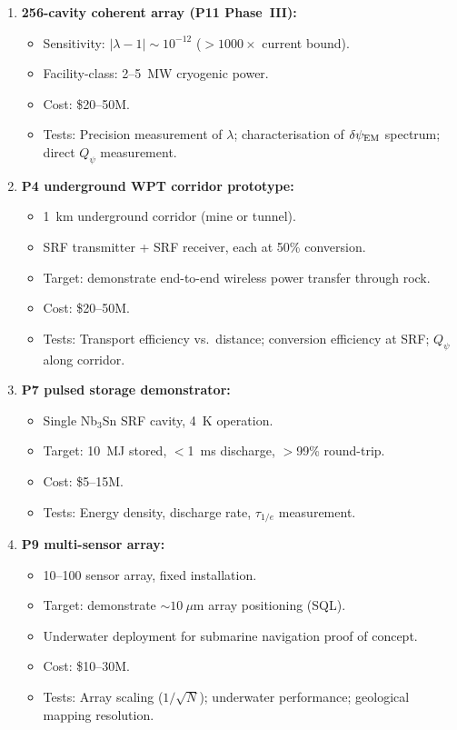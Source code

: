 \documentclass[11pt]{article}
\newcommand{\dpsiEM}{\delta\psi_{\rm EM}}
\newcommand{\lambdaone}{|\lambda{-}1|}
\begin{document}
\begin{tcolorbox}[colback=blue!5!white, colframe=blue!60!black,
  title=\textbf{Phase III: First Technology Demonstrations}]

\begin{enumerate}
\item \textbf{256-cavity coherent array (P11 Phase~III):}
  \begin{itemize}[nosep]
    \item Sensitivity: $\lambdaone \sim 10^{-12}$ ($>1000\times$
      current bound).
    \item Facility-class: 2--5~MW cryogenic power.
    \item Cost: \$20--50M.
    \item Tests: Precision measurement of $\lambda$; characterisation
      of $\dpsiEM$ spectrum; direct $Q_\psi$ measurement.
  \end{itemize}

\item \textbf{P4 underground WPT corridor prototype:}
  \begin{itemize}[nosep]
    \item 1~km underground corridor (mine or tunnel).
    \item SRF transmitter + SRF receiver, each at 50\% conversion.
    \item Target: demonstrate end-to-end wireless power transfer
      through rock.
    \item Cost: \$20--50M.
    \item Tests: Transport efficiency vs.\ distance; conversion
      efficiency at SRF; $Q_\psi$ along corridor.
  \end{itemize}

\item \textbf{P7 pulsed storage demonstrator:}
  \begin{itemize}[nosep]
    \item Single Nb$_3$Sn SRF cavity, 4~K operation.
    \item Target: 10~MJ stored, $<$1~ms discharge, $>$99\% round-trip.
    \item Cost: \$5--15M.
    \item Tests: Energy density, discharge rate, $\tau_{1/e}$
      measurement.
  \end{itemize}

\item \textbf{P9 multi-sensor array:}
  \begin{itemize}[nosep]
    \item 10--100 sensor array, fixed installation.
    \item Target: demonstrate $\sim 10~\mu$m array positioning (SQL).
    \item Underwater deployment for submarine navigation proof of
      concept.
    \item Cost: \$10--30M.
    \item Tests: Array scaling ($1/\sqrt{N}$); underwater performance;
      geological mapping resolution.
  \end{itemize}


\end{enumerate}
\end{tcolorbox}
\end{document}
